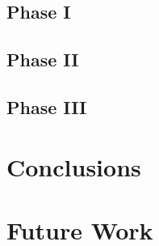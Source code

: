 \documentclass[numbered,pdftex]{ohio-etd}
\begin{document}
\section{Phase I}
\section{Phase II}
\section{Phase III}

\chapter{Conclusions}

\chapter{Future Work}


   

\end{document}
